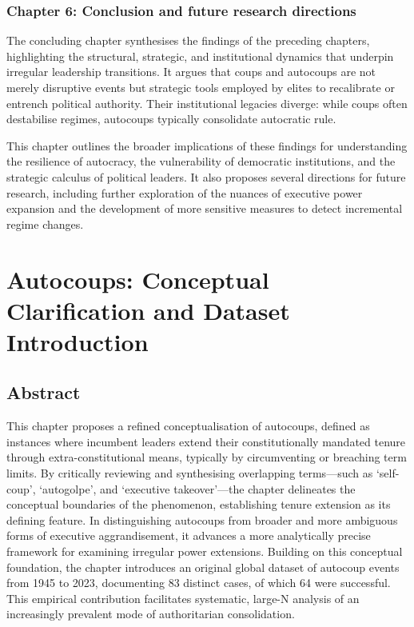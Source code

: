 \documentclass[
  12pt,
]{report}
\begin{document}
\subsection*{Chapter 6: Conclusion and future research
directions}\label{chapter-6-conclusion-and-future-research-directions}

The concluding chapter synthesises the findings of the preceding
chapters, highlighting the structural, strategic, and institutional
dynamics that underpin irregular leadership transitions. It argues that
coups and autocoups are not merely disruptive events but strategic tools
employed by elites to recalibrate or entrench political authority. Their
institutional legacies diverge: while coups often destabilise regimes,
autocoups typically consolidate autocratic rule.

This chapter outlines the broader implications of these findings for
understanding the resilience of autocracy, the vulnerability of
democratic institutions, and the strategic calculus of political
leaders. It also proposes several directions for future research,
including further exploration of the nuances of executive power
expansion and the development of more sensitive measures to detect
incremental regime changes.

\chapter{Autocoups: Conceptual Clarification and Dataset
Introduction}\label{sec-chapter3}

\section*{Abstract}\label{abstract-1}

This chapter proposes a refined conceptualisation of autocoups, defined
as instances where incumbent leaders extend their constitutionally
mandated tenure through extra-constitutional means, typically by
circumventing or breaching term limits. By critically reviewing and
synthesising overlapping terms---such as `self-coup', `autogolpe', and
`executive takeover'---the chapter delineates the conceptual boundaries
of the phenomenon, establishing tenure extension as its defining
feature. In distinguishing autocoups from broader and more ambiguous
forms of executive aggrandisement, it advances a more analytically
precise framework for examining irregular power extensions. Building on
this conceptual foundation, the chapter introduces an original global
dataset of autocoup events from 1945 to 2023, documenting 83 distinct
cases, of which 64 were successful. This empirical contribution
facilitates systematic, large-N analysis of an increasingly prevalent
mode of authoritarian consolidation.
\end{document}
